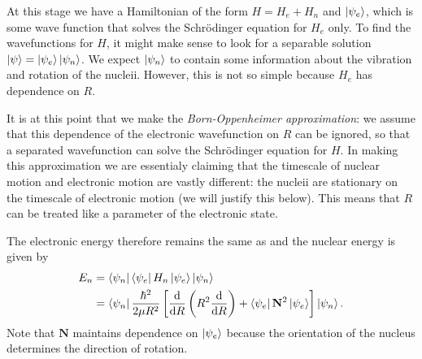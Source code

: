At this stage we have a Hamiltonian of the form $H = H_e + H_n$ and
$\ket{\psi_e}$, which is some wave function that solves the Schr\"odinger
equation for $H_e$ only. To find the wavefunctions for $H$, it might make sense
to look for a separable solution $\ket{\psi} = \ket{\psi_e}\ket{\psi_n}$. We
expect $\ket{\psi_n}$ to contain some information about the vibration and
rotation of the nucleii. However, this is not so simple because $H_e$ has
dependence on $R$.

It is at this point that we make the \emph{Born-Oppenheimer approximation}: we
assume that this dependence of the electronic wavefunction on $R$ can be
ignored, so that a separated wavefunction can solve the Schr\"odinger equation
for $H$. In making this approximation we are essentialy claiming that the
timescale of nuclear motion and electronic motion are vastly different: the
nucleii are stationary on the timescale of electronic motion (we will justify
this below). This means that $R$ can be treated like a parameter of the
electronic state.

The electronic energy therefore remains the same as  and the 
nuclear energy is given by
\begin{align}
  E_n &= \bra{\psi_n}\bra{\psi_e} H_n \ket{\psi_e}\ket{\psi_n} \\
  &= \bra{\psi_n}\frac{\hbar^2}{2\mu R^2}\left[ \frac{\dd}{\dd R}\left(R^2 
  \frac{\dd }{\dd R}\right) + \bra{\psi_e}\mathbf{N}^2\ket{\psi_e} \right]
  \ket{\psi_n}.
\end{align}
Note that $\mathbf{N}$ maintains dependence on $\ket{\psi_e}$ because the
orientation of the nucleus determines the direction of rotation. 
